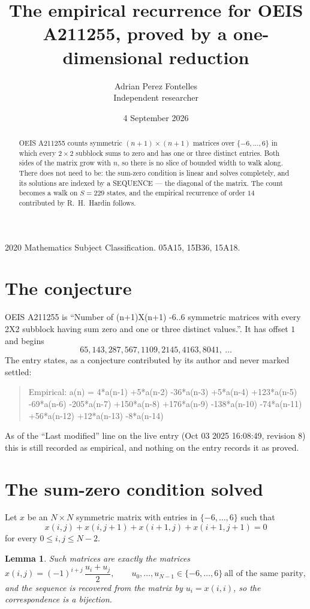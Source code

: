 \documentclass[11pt,a4paper]{article}
\title{The empirical recurrence for OEIS A211255, proved by a one-dimensional reduction}
\author{Adrian Perez Fontelles\\ \small Independent researcher}
\date{4 September 2026}
\theoremstyle{plain}
\newtheorem{lemma}[theorem]{Lemma}
\theoremstyle{definition}
\begin{document}
\maketitle

\begin{abstract}
OEIS A211255 counts symmetric $(n+1)\times(n+1)$ matrices over
$\{-6,\dots,6\}$ in which every $2\times2$ subblock sums to zero and has one or three distinct
entries. Both sides of the matrix grow with $n$, so there is no slice of bounded width to walk
along. There does not need to be: the sum-zero condition is linear and solves completely, and
its solutions are indexed by a SEQUENCE --- the diagonal of the matrix. The count becomes a walk
on $S=229$ states, and the empirical recurrence of order $14$ contributed by R.~H.~Hardin
follows.
\end{abstract}

\noindent\small 2020 Mathematics Subject Classification. 05A15, 15B36, 15A18.\normalsize

\section{The conjecture}

OEIS A211255 is ``Number of (n+1)X(n+1) -6..6 symmetric matrices with every 2X2 subblock having sum zero and one or three distinct values.''. It has offset $1$ and begins
\[
65, 143, 287, 567, 1109, 2145, 4163, 8041,\ \dots
\]
The entry states, as a conjecture contributed by its author and never marked settled:
\begin{quote}
Empirical: a(n) = 4*a(n-1) +5*a(n-2) -36*a(n-3) +5*a(n-4) +123*a(n-5) -69*a(n-6) -205*a(n-7) +150*a(n-8) +176*a(n-9) -138*a(n-10) -74*a(n-11) +56*a(n-12) +12*a(n-13) -8*a(n-14)
\end{quote}
As of the ``Last modified'' line on the live entry (Oct 03 2025 16:08:49, revision 8) this is still
recorded as empirical, and nothing on the entry records it as proved.

\section{The sum-zero condition solved}

Let $x$ be an $N\times N$ symmetric matrix with entries in $\{-6,\dots,6\}$ such that
\[
x(i,j)+x(i,j{+}1)+x(i{+}1,j)+x(i{+}1,j{+}1)=0
\]
for every $0\le i,j\le N-2$.

\begin{lemma}\label{lem:solve}
Such matrices are exactly the matrices
\[
x(i,j)=(-1)^{i+j}\,\frac{u_i+u_j}{2},
\qquad u_0,\dots,u_{N-1}\in\{-6,\dots,6\}\ \text{all of the same parity},
\]
and the sequence is recovered from the matrix by $u_i=x(i,i)$, so the correspondence is a
bijection.
\end{lemma}
\end{document}

